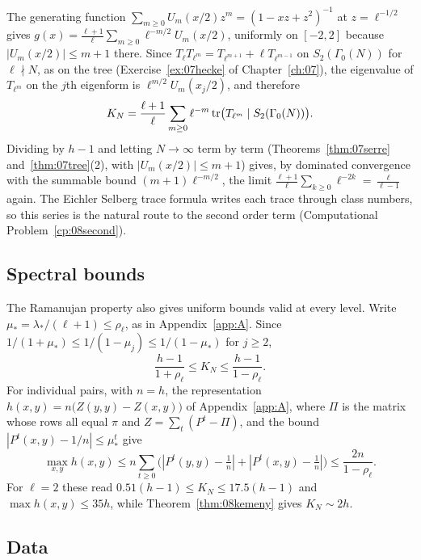 \begin{remark}\label{rem:08exact}
The generating function $\sum_{m\ge0}U_m(x/2)z^m=(1-xz+z^2)^{-1}$ at $z=\ell^{-1/2}$ gives $g(x)=\frac{\ell+1}{\ell}\sum_{m\ge0}\ell^{-m/2}U_m(x/2)$, uniformly on $[-2,2]$ because $|U_m(x/2)|\le m+1$ there. Since $T_\ell T_{\ell^m}=T_{\ell^{m+1}}+\ell T_{\ell^{m-1}}$ on $S_2(\Gamma_0(N))$ for $\ell\nmid N$, as on the tree (Exercise~\ref{ex:07hecke} of Chapter~\ref{ch:07}), the eigenvalue of $T_{\ell^m}$ on the $j$th eigenform is $\ell^{m/2}U_m(x_j/2)$, and therefore
\[
K_N=\frac{\ell+1}{\ell}\sum_{m\ge0}\ell^{-m}\operatorname{tr}\bigl(T_{\ell^m}\mid S_2(\Gamma_0(N))\bigr).
\]
Dividing by $h-1$ and letting $N\to\infty$ term by term (Theorems~\ref{thm:07serre} and~\ref{thm:07tree}(2), with $|U_m(x/2)|\le m+1$) gives, by dominated convergence with the summable bound $(m+1)\ell^{-m/2}$, the limit $\frac{\ell+1}{\ell}\sum_{k\ge0}\ell^{-2k}=\frac{\ell}{\ell-1}$ again. The Eichler Selberg trace formula writes each trace through class numbers, so this series is the natural route to the second order term (Computational Problem~\ref{cp:08second}).
\end{remark}

\subsection{Spectral bounds}

The Ramanujan property also gives uniform bounds valid at every level. Write $\mu_*=\lambda_*/(\ell+1)\le\rho_\ell$, as in Appendix~\ref{app:A}. Since $1/(1+\mu_*)\le1/(1-\mu_j)\le1/(1-\mu_*)$ for $j\ge2$,
\[
\frac{h-1}{1+\rho_\ell}\le K_N\le\frac{h-1}{1-\rho_\ell}.
\]
For individual pairs, with $n=h$, the representation $h(x,y)=n\bigl(Z(y,y)-Z(x,y)\bigr)$ of Appendix~\ref{app:A}, where $\Pi$ is the matrix whose rows all equal $\pi$ and $Z=\sum_t(P^t-\Pi)$, and the bound $|P^t(x,y)-1/n|\le\mu_*^t$ give
\[
\max_{x,y}h(x,y)\le n\sum_{t\ge0}\bigl(|P^t(y,y)-\tfrac1n|+|P^t(x,y)-\tfrac1n|\bigr)\le\frac{2n}{1-\rho_\ell}.
\]
For $\ell=2$ these read $0.51(h-1)\le K_N\le17.5(h-1)$ and $\max h(x,y)\le35h$, while Theorem~\ref{thm:08kemeny} gives $K_N\sim2h$.

\subsection{Data}

